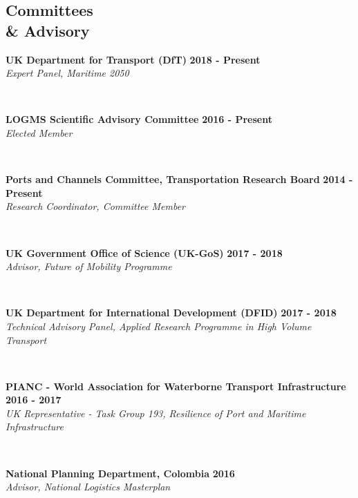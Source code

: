 \documentclass[margin]{res}
\newcommand\tab[1][1cm]{\hspace*{#1}}
\begin{document}
\begin{resume}
\section{\sc Committees\\ \&  Advisory}
\vspace{+0.1in}
	\begin{minipage}{\textwidth}
	{\bf UK Department for Transport (DfT)} \hfill {\bf 2018 - Present} \\
	\tab[0.2in] \textit{Expert Panel, Maritime 2050}
	\end{minipage}
	\vspace{0.02in}
	\\
	\begin{minipage}{\textwidth}
	{\bf LOGMS Scientific Advisory Committee} \hfill {\bf 2016 - Present} \\
	\tab[0.2in] \textit{Elected Member}
	\end{minipage}
	\vspace{0.02in}
	\\
	\begin{minipage}{\textwidth}
	{\bf Ports and Channels Committee, Transportation Research Board} \hfill {\bf 2014 - Present} \\
	\tab[0.2in] \textit{Research Coordinator, Committee Member}
	\end{minipage}
	\vspace{0.02in}
	\\
	\begin{minipage}{\textwidth}
	{\bf UK Government Office of Science (UK-GoS)} \hfill {\bf 2017 - 2018} \\
	\tab[0.2in] \textit{Advisor, Future of Mobility Programme}
	\end{minipage}
	\vspace{0.02in}
	\\
	\begin{minipage}{\textwidth}
	{\bf UK Department for International Development (DFID)} \hfill {\bf 2017 - 2018} \\
	\tab[0.2in] \textit{Technical Advisory Panel, Applied Research Programme in High Volume Transport}
	\end{minipage}
	\vspace{0.02in}
	\\
	\begin{minipage}{\textwidth}
	{\bf PIANC - World Association for Waterborne Transport Infrastructure} \hfill {\bf 2016 - 2017} \\
	\tab[0.2in] \textit{UK Representative - Task Group 193, Resilience of Port and Maritime Infrastructure}
	\end{minipage}
	\vspace{0.02in}
	\\
	\begin{minipage}{\textwidth}
	{\bf National Planning Department, Colombia} \hfill {\bf 2016} \\
	\tab[0.2in] \textit{Advisor, National Logistics Masterplan}
	\end{minipage}
	\vspace{0.02in}
	\\


\end{resume}
\end{document}
